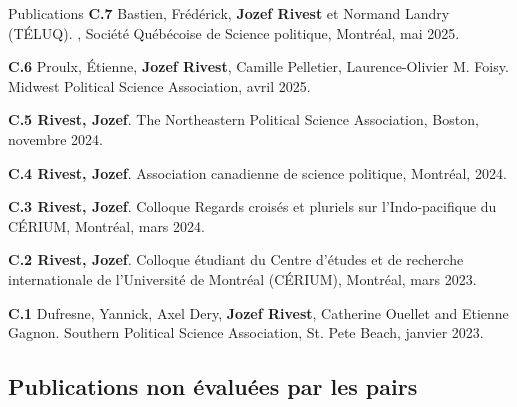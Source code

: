 \documentclass{resume} %
\begin{document}
\begin{rSection}{Publications}
{\textbf{C.7} Bastien, Frédérick, \textbf{Jozef Rivest} et Normand Landry (TÉLUQ). , Société Québécoise de Science politique, Montréal, mai 2025.}

{\textbf{C.6} Proulx, Étienne, \textbf{Jozef Rivest}, Camille Pelletier, Laurence-Olivier M. Foisy.  Midwest Political Science Association, avril 2025.}

{\textbf{C.5 Rivest, Jozef}.  The Northeastern Political Science Association, Boston, novembre 2024.}

{\textbf{C.4 Rivest, Jozef}.  Association canadienne de science politique, Montréal, 2024.}

{\textbf{C.3 Rivest, Jozef}.  Colloque Regards croisés et pluriels sur l'Indo-pacifique du CÉRIUM, Montréal, mars 2024.}

{\textbf{C.2 Rivest, Jozef}.  Colloque étudiant du Centre d'études et de recherche internationale de l'Université de Montréal (CÉRIUM), Montréal, mars 2023.} \par

{\textbf{C.1} Dufresne, Yannick, Axel Dery, \textbf{Jozef Rivest}, Catherine Ouellet and Etienne Gagnon.  Southern Political Science Association, St. Pete Beach, janvier 2023.}



\subsection*{Publications non évaluées par les pairs}


\end{rSection}
\end{document}

